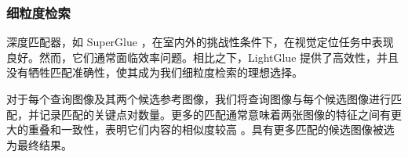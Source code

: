 \subsubsection{细粒度检索}

深度匹配器，如 SuperGlue \cite{sarlin2020supergluelearningfeaturematching}，在室内外的挑战性条件下，在视觉定位任务中表现良好。然而，它们通常面临效率问题。相比之下，LightGlue \cite{lindenberger2023lightgluelocalfeaturematching} 提供了高效性，并且没有牺牲匹配准确性，使其成为我们细粒度检索的理想选择。

对于每个查询图像及其两个候选参考图像，我们将查询图像与每个候选图像进行匹配，并记录匹配的关键点对数量。更多的匹配通常意味着两张图像的特征之间有更大的重叠和一致性，表明它们内容的相似度较高 \cite{Lowe2004DistinctiveIF}。具有更多匹配的候选图像被选为最终结果。
